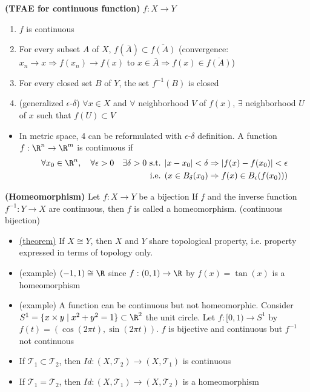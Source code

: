 \documentclass[10.5pt]{article}
\newcommand{\calT}{\mathcal{T}}
\begin{document}
\begin{theorem*}
    \textbf{(TFAE for continuous function)} $f:X\to Y$
    \begin{enumerate}
        \item $f$ is continuous
        \item For every subset $A$ of $X$, $f(\overline{A}) \subset \overline{f(A)}$ (convergence: $x_n \to x \Rightarrow f(x_n)\to f(x)$ to $x\in \overline{A} \Rightarrow f(x)\in \overline{f(A)}$)
        \item For every closed set $B$ of $Y$, the set $f^{-1}(B)$ is closed
        \item (generalized $\epsilon$-$\delta$) $\forall x\in X$ and $\forall$ neighborhood $V$ of $f(x)$, $\exists$ neighborhood $U$ of $x$ such that $f(U)\subset V$
    \end{enumerate}
    \begin{itemize}
        \item In metric space, 4 can be reformulated with $\epsilon$-$\delta$ definition. A function $f:\R^n \to \R^m$ is continuous if 
        \begin{align*}
            \forall x_0 \in \R^n, \quad \forall \epsilon > 0 \quad \exists \delta > 0 \text{ s.t. } & |x-x_0|<\delta \Rightarrow |f(x)-f(x_0)|<\epsilon \\ 
            \text{ i.e. } & (x\in B_{\delta}(x_0) \Rightarrow f(x)\in B_{\epsilon}(f(x_0)))
        \end{align*}
    \end{itemize}
\end{theorem*}

\begin{defn*}
    \textbf{(Homeomorphism)} Let $f:X\to Y$ be a bijection If $f$ and the inverse function $f^{-1}:Y\to X$ are continuous, then $f$ is called a homeomorphism. (continuous bijection)
    \begin{itemize}
        \item \underline{(theorem)} If $X\cong Y$, then $X$ and $Y$ share topological property, i.e. property expressed in terms of topology only.
        \item (example) $(-1,1) \cong \R$ since $f: (0,1) \to \R$ by $f(x) = \tan(x)$ is a homeomorphism
        \item (example) A function can be continuous but not homeomorphic. Consider $S^1 = \{x\times y\mid x^2 + y^2 = 1\}\subset \R^2$ the unit circle. Let $f:[0,1) \to S^1$ by $f(t) = (\cos(2\pi t), \sin(2\pi t))$. $f$ is bijective and continuous but $f^{-1}$ not continuous
        \item If $\calT_1 \subset \calT_2$, then $Id: (X,\calT_2) \to (X,\calT_1)$ is continuous
        \item If $\calT_1 = \calT_2$, then $Id: (X, \calT_1) \to (X,\calT_2)$ is a homeomorphism
    \end{itemize}
\end{defn*}
\end{document}
